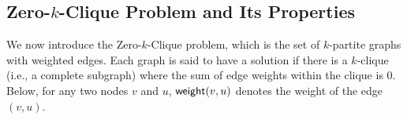 	

\subsection{Zero-$k$-Clique Problem and Its Properties}
We now introduce the Zero-$k$-Clique problem, which is the set of $k$-partite graphs with weighted edges. Each graph is said to have a solution if there is a $k$-clique (i.e., a complete subgraph) where the sum of edge weights within the clique is $0$. Below, for any two nodes $v$ and $u$, $\mathsf{weight}(v,u)$ denotes the weight of the edge $(v,u)$.

